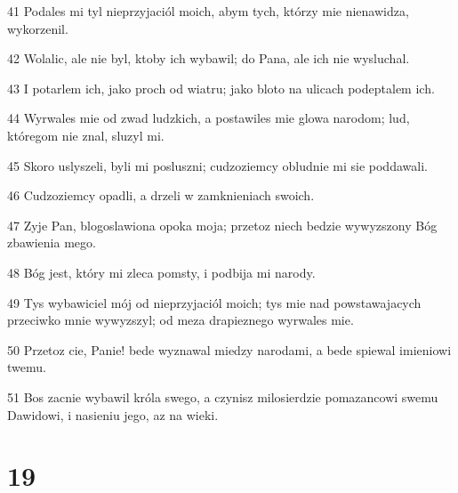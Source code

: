 \par 41 Podales mi tyl nieprzyjaciól moich, abym tych, którzy mie nienawidza, wykorzenil.
\par 42 Wolalic, ale nie byl, ktoby ich wybawil; do Pana, ale ich nie wysluchal.
\par 43 I potarlem ich, jako proch od wiatru; jako bloto na ulicach podeptalem ich.
\par 44 Wyrwales mie od zwad ludzkich, a postawiles mie glowa narodom; lud, któregom nie znal, sluzyl mi.
\par 45 Skoro uslyszeli, byli mi posluszni; cudzoziemcy obludnie mi sie poddawali.
\par 46 Cudzoziemcy opadli, a drzeli w zamknieniach swoich.
\par 47 Zyje Pan, blogoslawiona opoka moja; przetoz niech bedzie wywyzszony Bóg zbawienia mego.
\par 48 Bóg jest, który mi zleca pomsty, i podbija mi narody.
\par 49 Tys wybawiciel mój od nieprzyjaciól moich; tys mie nad powstawajacych przeciwko mnie wywyzszyl; od meza drapieznego wyrwales mie.
\par 50 Przetoz cie, Panie! bede wyznawal miedzy narodami, a bede spiewal imieniowi twemu.
\par 51 Bos zacnie wybawil króla swego, a czynisz milosierdzie pomazancowi swemu Dawidowi, i nasieniu jego, az na wieki.

\chapter{19}

